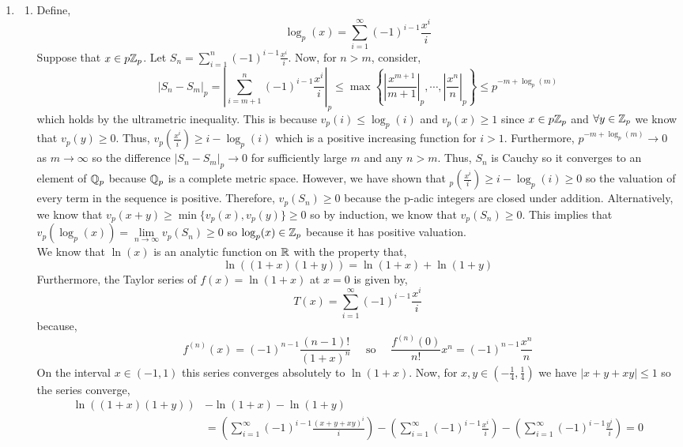 \documentclass[12pt]{extarticle}
\begin{document}
\begin{enumerate}
\begin{enumerate}
\end{enumerate}
\item
\begin{enumerate}
\item Define,
\[ \log_p(x) = \sum_{i = 1}^\infty (-1)^{i-1} \frac{x^i}{i} \]
Suppose that $x \in p \mathbb{Z}_p$. Let $S_n = \sum_{i = 1}^n (-1)^{i - 1} \frac{x^i}{i}$. Now, for $n > m$, consider,
\[ |S_n - S_m|_p = \left| \sum_{i = m + 1}^n (-1)^{i - 1} \frac{x^i}{i} \right|_p \le \max\left\{ \left| \frac{x^{m+1}}{m+1} \right|_p, \cdots, \left| \frac{x^{n}}{n} \right|_p \right\} \le p^{- m + \log_p(m)}\] 
which holds by the ultrametric inequality. This is because $v_p(i) \le \log_p(i)$ and $v_p(x) \ge 1$ since $x \in p \mathbb{Z}_p$ and $\forall y \in \mathbb{Z}_p$ we know that $v_p(y) \ge 0$. Thus, $v_p(\frac{x^i}{i}) \ge i - \log_p(i)$ which is a positive increasing function for $i > 1$. Furthermore, $p^{-m + \log_p(m)} \to 0$ as $m \to \infty$ so the difference $|S_n - S_m|_p \to 0$ for sufficiently large $m$ and any $n > m$. Thus, $S_n$ is Cauchy so it converges to an element of $\mathbb{Q}_p$ because $\mathbb{Q}_p$ is a complete metric space. However, we have shown that $_p(\frac{x^i}{i}) \ge i - \log_p(i) \ge 0$ so the valuation of every term in the sequence is positive. Therefore, $v_p(S_n) \ge 0$ because the p-adic integers are closed under addition. Alternatively, we know that $v_p(x + y) \ge \min\{v_p(x), v_p(y)\} \ge 0$ so by induction, we know that $v_p(S_n) \ge 0$. This implies that $v_p(\log_p(x)) = \lim\limits_{n \to \infty} v_p (S_n) \ge 0$ so $\log_p(x) \in \mathbb{Z}_p$ because it has positive valuation. \bigskip \\
We know that $\ln(x)$ is an analytic function on $\mathbb{R}$ with the property that, 
\[\ln((1 + x)(1 + y)) = \ln(1 + x) + \ln(1 + y)\]
Furthermore, the Taylor series of $f(x) = \ln(1 + x)$ at $x = 0$ is given by,
\[T(x) = \sum_{i = 1}^\infty (-1)^{i - 1} \frac{x^i}{i} \]
because, 
\[f^{(n)}(x) = (-1)^{n - 1} \frac{(n-1)!}{(1 + x)^n} \quad \text{ so } \quad \frac{f^{(n)}(0)}{n!} x^n = (-1)^{n - 1} \frac{x^n}{n}\]
On the interval $x \in (-1, 1)$ this series converges absolutely to $\ln(1 + x)$. Now, for $x, y \in (-\frac{1}{4}, \frac{1}{4})$ we have $|x + y + xy| \le 1$ so the series converge,
\begin{align*}
\ln((1 + x)(1 + y)) & - \ln(1 + x) - \ln(1 + y) \\ 
& = \left(\sum_{i = 1}^\infty (-1)^{i - 1} \frac{(x + y + xy)^i}{i}\right) - \left(\sum_{i = 1}^\infty (-1)^{i - 1} \frac{x^i}{i}\right) - \left(\sum_{i = 1}^\infty (-1)^{i - 1} \frac{y^i}{i}\right) = 0
\end{align*} 

\end{enumerate}
\end{enumerate}
\end{document}
